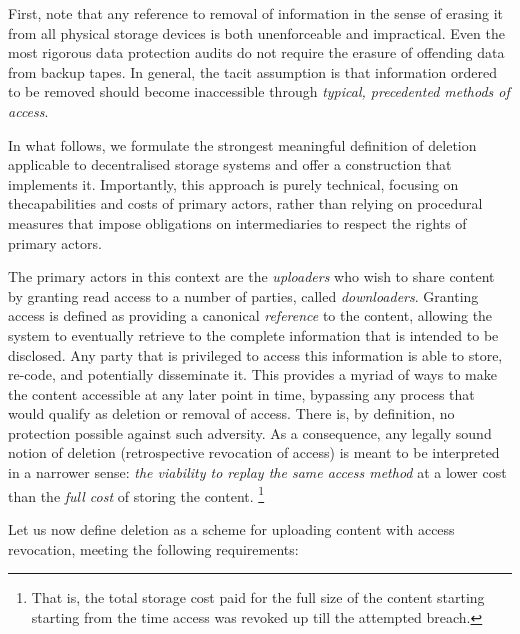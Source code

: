 First, note that any reference to removal of information in the sense of erasing it from all physical storage devices is both unenforceable and impractical. Even the most rigorous data protection audits do not require the erasure of offending data from backup tapes. In general, the tacit assumption is that information ordered to be removed should become inaccessible through \emph{typical, precedented methods of access}.

In what follows, we formulate the strongest meaningful definition of deletion applicable to decentralised storage systems and offer a construction that implements it.
Importantly, this approach is purely technical, focusing on thecapabilities and costs of primary actors, rather than relying on  procedural measures that impose obligations on intermediaries to respect the rights of primary actors. 

The primary actors in this context are the \emph{uploaders} who wish to share content by granting read access to a number of parties, called \emph{downloaders}.  Granting access is defined as providing a canonical \emph{reference} to the content, allowing the system to eventually retrieve to the complete information that is intended to be disclosed. Any party that is privileged to access this information is able to store, re-code, and potentially disseminate it. This provides a myriad of ways to make the content accessible at any later point in time, bypassing any process that would qualify as deletion or removal of access. 
There is, by definition, no protection possible against such adversity. As a consequence, any legally sound notion of deletion (retrospective revocation of access) is meant to be interpreted in a narrower sense: \emph{the viability to replay the same access method}  at a lower cost than the \emph{full cost} of storing the content.%
%
\footnote{That is, the total storage cost paid for the full size of the content starting  starting from the time access was revoked up till the attempted breach.}

Let us now define deletion as a scheme for uploading content with access revocation, meeting the following requirements: 

